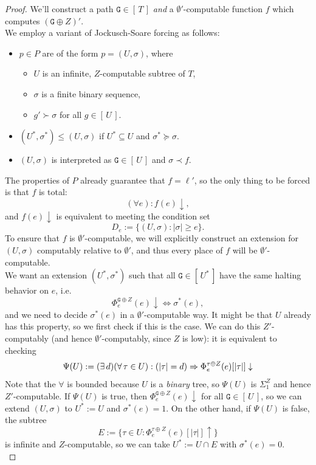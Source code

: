 \documentclass{amsart}
\begin{document}
	\begin{proof}
		We'll construct a path $\mathtt{G}\in [\, T\,]$ \textit{and} a $\emptyset'$-computable function $f$ which computes $(\mathtt{G}\oplus Z)'$.\\
		\indent We employ a variant of Jockusch-Soare forcing as follows: 
		\begin{itemize} 
			\item $p\in P$ are of the form $p=(U,\sigma)$, where
			\begin{itemize}
				\item $U$ is an infinite, $Z$-computable subtree of $T$,
				\item $\sigma$ is a finite binary sequence,
				\item $g' \succ \sigma$ for all $g\in [\, U\,]$.
			\end{itemize}
			\item $(U^*,\sigma^*)\leq (U,\sigma)$ if $U^*\subseteq U$ and $\sigma^*\succeq \sigma$.
			\item $(U,\sigma )$ is interpreted as $\mathtt{G}\in [\, U \,]$ and $\sigma \prec f$.
		\end{itemize} 
		The properties of $P$ already guarantee that $f=\ell'$, so the only thing to be forced is that $f$ is total:
		$$
		(\forall e): f(e)\downarrow,
		$$
		and $f(e)\downarrow$ is equivalent to meeting the condition set
		$$
		D_e := \{(U,\sigma): |\sigma| \geq e\}.
		$$
		To ensure that $f$ is $\emptyset'$-computable, we will explicitly construct an extension for $(U,\sigma)$ computably relative to $\emptyset'$, and thus every place of $f$ will be $\emptyset'$-computable.\\
		
		We want an extension $(U^*,\sigma^*)$ such that all $\mathtt{G}\in [\,U^*\,]$ have the same halting behavior on $e$, i.e.
		$$
		\Phi_e^{\mathtt{G}\oplus Z}(e)\downarrow \iff \sigma^*(e),
		$$
		and we need to decide $\sigma^*(e)$ in a $\emptyset'$-computable way. It might be that $U$ already has this property, so we first check if this is the case. We can do this $Z'$-computably (and hence $\emptyset'$-computably, since $Z$ is low): it is equivalent to checking 
		$$
		\Psi(U) := (\exists\, d)(\forall\, \tau\in U): (|\tau|=d) \Rightarrow \Phi^{\tau\oplus Z}_e(e)[|\tau|]\downarrow
		$$
		Note that the $\forall$ is bounded because $U$ is a \textit{binary} tree, so $\Psi(U)$ is $\Sigma_1^Z$ and hence $Z'$-computable. If $\Psi(U)$ is true, then $\Phi_e^{\mathtt{G}\oplus Z}(e)\downarrow$ for all $\mathtt{G}\in [\, U \,]$, so we can extend $(U,\sigma)$ to $U^*:=U$ and $\sigma^*(e)=1$. On the other hand, if $\Psi(U)$ is false, the subtree 
		$$E := \{\tau\in U: \Phi^{\tau\oplus Z}_e(e)[|\tau|]\uparrow\}$$
		is infinite and $Z$-computable, so we can take $U^*:=U\cap E$ with $\sigma^*(e)=0$.\\
		

\end{proof}
\end{document}
